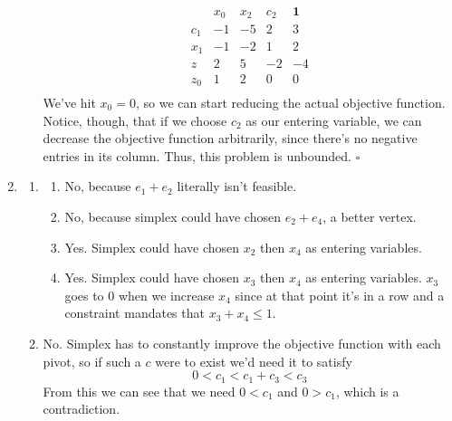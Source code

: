 \documentclass[12pt]{article}
\begin{document}
\begin{enumerate}
\begin{enumerate}
\[\begin{array}{c|rrr|l}
                                        & x_0 & x_2 & c_2 & \mathbf{1} \\ \hline
                                    c_1 & -1  & -5  & 2   & 3          \\
                                    x_1 & -1  & -2  & 1   & 2          \\ \hline
                                    z   & 2   & 5   & -2  & -4         \\ \hline
                                    z_0 & 1   & 2   & 0   & 0          \\
                              \end{array}\]
                        We've hit $x_0=0$, so we can start reducing the actual objective function.
                        Notice, though, that if we choose $c_2$ as our entering variable,
                        we can decrease the objective function arbitrarily,
                        since there's no negative entries in its column.
                        Thus, this problem is unbounded. $\square$
            \end{enumerate}
      \item \begin{enumerate}
                  \item \begin{enumerate}
                              \item No, because $e_1+e_2$ literally isn't feasible.
                              \item No, because simplex could have chosen $e_2+e_4$,
                                    a better vertex.
                              \item Yes.
                                    Simplex could have chosen $x_2$ then $x_4$ as entering variables.
                              \item Yes.
                                    Simplex could have chosen $x_3$ then $x_4$ as entering variables.
                                    $x_3$ goes to $0$ when we increase $x_4$
                                    since at that point it's in a row and a constraint mandates that $x_3+x_4 \le 1$.
                        \end{enumerate}
                  \item No.
                        Simplex has to constantly improve the objective function with each pivot,
                        so if such a $c$ were to exist we'd need it to satisfy
                        \[0 < c_1 < c_1 + c_3 < c_3\]
                        From this we can see that we need $0<c_1$ and $0>c_1$, which is a contradiction.
            \end{enumerate}
\end{enumerate}
\end{document}
